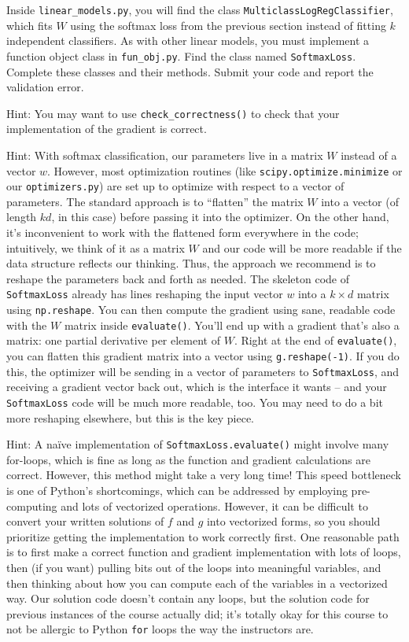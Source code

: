 \documentclass{article}
\newcommand{\blu}[1]{{\textcolor{blu}{#1}}}
\let\ask\blu
\begin{document}
Inside \verb|linear_models.py|, you will find the class \verb|MulticlassLogRegClassifier|, which fits $W$ using the softmax loss from the previous section instead of fitting $k$ independent classifiers. As with other linear models, you must implement a function object class in \verb|fun_obj.py|. Find the class named \verb|SoftmaxLoss|. Complete these classes and their methods. \ask{Submit your code and report the validation error.}

Hint: You may want to use \verb|check_correctness()| to check that your implementation of the gradient is correct.

Hint: With softmax classification, our parameters live in a matrix $W$ instead of a vector $w$. However, most optimization routines (like \verb|scipy.optimize.minimize| or our \verb|optimizers.py|) are set up to optimize with respect to a vector of parameters. The standard approach is to ``flatten'' the matrix $W$ into a vector (of length $kd$, in this case) before passing it into the optimizer. On the other hand, it's inconvenient to work with the flattened form everywhere in the code; intuitively, we think of it as a matrix $W$ and our code will be more readable if the data structure reflects our thinking. Thus, the approach we recommend is to reshape the parameters back and forth as needed. The skeleton code of \verb|SoftmaxLoss| already has lines reshaping the input vector $w$ into a $k \times d$ matrix using \verb|np.reshape|. You can then compute the gradient using sane, readable code with the $W$ matrix inside \verb|evaluate()|. You'll end up with a gradient that's also a matrix: one partial derivative per element of $W$. Right at the end of \verb|evaluate()|, you can flatten this gradient matrix into a vector using \verb|g.reshape(-1)|. If you do this, the optimizer will be sending in a vector of parameters to \verb|SoftmaxLoss|, and receiving a gradient vector back out, which is the interface it wants -- and your \verb|SoftmaxLoss| code will be much more readable, too. You may need to do a bit more reshaping elsewhere, but this is the key piece.

Hint: A na\"ive implementation of \verb|SoftmaxLoss.evaluate()| might involve many for-loops, which is fine as long as the function and gradient calculations are correct. However, this method might take a very long time! This speed bottleneck is one of Python's shortcomings, which can be addressed by employing pre-computing and lots of vectorized operations. However, it can be difficult to convert your written solutions of $f$ and $g$ into vectorized forms, so you should prioritize getting the implementation to work correctly first. One reasonable path is to first make a correct function and gradient implementation with lots of loops, then (if you want) pulling bits out of the loops into meaningful variables, and then thinking about how you can compute each of the variables in a vectorized way. Our solution code doesn't contain any loops, but the solution code for previous instances of the course actually did; it's totally okay for this course to not be allergic to Python \verb|for| loops the way the instructors are.
\end{document}
